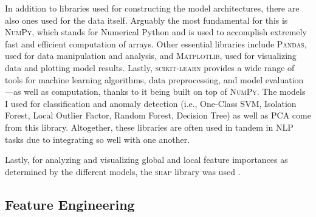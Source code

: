 \documentclass[12pt,a4paper]{article}
\numberwithin{figure}{section}
\numberwithin{table}{section}
\numberwithin{definition}{section}
\begin{document}
In addition to libraries used for constructing the model architectures, there are also ones used for the data itself. Arguably the most fundamental for this is \textsc{NumPy}\parencite{Harris2020article}, which stands for Numerical Python and is used to accomplish extremely fast and efficient computation of arrays. Other essential libraries include \textsc{Pandas}\parencite{reback2020pandas,Mckinney2010article}, used for data manipulation and analysis, and \textsc{Matplotlib}\parencite{Hunter2007article}, used for visualizing data and plotting model results. Lastly, \textsc{scikit-learn}\parencite{Pedregosa2011article} provides a wide range of tools for machine learning algorithms, data preprocessing, and model evaluation---as well as computation, thanks to it being built on top of \textsc{NumPy}. The models I used for classification and anomaly detection (i.e., One-Class SVM, Isolation Forest, Local Outlier Factor, Random Forest, Decision Tree) as well as PCA come from this library. Altogether, these libraries are often used in tandem in NLP tasks due to integrating so well with one another.

Lastly, for analyzing and visualizing global and local feature importances as determined by the different models, the \textsc{shap} library was used \parencite{Lundberg2017article}.

\subsection{Feature Engineering}
\label{ssec:featureengineering}


\end{document}
